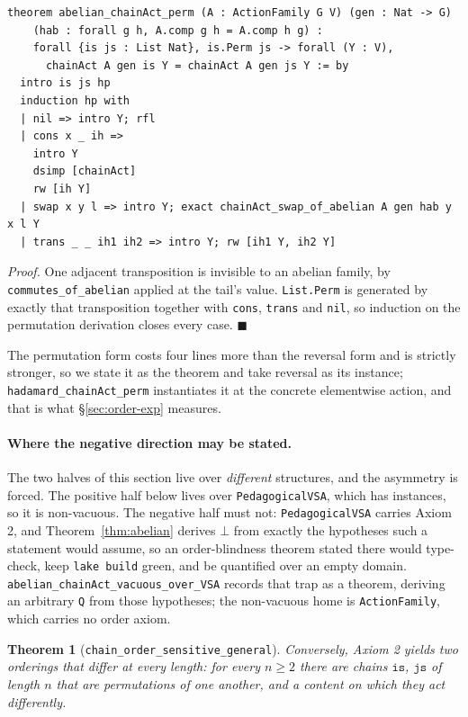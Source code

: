 \documentclass[10pt]{article}
\newtheorem{theorem}{Theorem}[section]
\begin{document}
\begin{lstlisting}
theorem abelian_chainAct_perm (A : ActionFamily G V) (gen : Nat -> G)
    (hab : forall g h, A.comp g h = A.comp h g) :
    forall {is js : List Nat}, is.Perm js -> forall (Y : V),
      chainAct A gen is Y = chainAct A gen js Y := by
  intro is js hp
  induction hp with
  | nil => intro Y; rfl
  | cons x _ ih =>
    intro Y
    dsimp [chainAct]
    rw [ih Y]
  | swap x y l => intro Y; exact chainAct_swap_of_abelian A gen hab y x l Y
  | trans _ _ ih1 ih2 => intro Y; rw [ih1 Y, ih2 Y]
\end{lstlisting}

\emph{Proof.} One adjacent transposition is invisible to an abelian family, by \texttt{commutes\_of\_abelian} applied at the tail's value. \texttt{List.Perm} is generated by exactly that transposition together with \texttt{cons}, \texttt{trans} and \texttt{nil}, so induction on the permutation derivation closes every case. $\blacksquare$

The permutation form costs four lines more than the reversal form and is strictly stronger, so we state it as the theorem and take reversal as its instance; \texttt{hadamard\_chainAct\_perm} instantiates it at the concrete elementwise action, and that is what \S\ref{sec:order-exp} measures.

\paragraph{Where the negative direction may be stated.} The two halves of this section live over \emph{different} structures, and the asymmetry is forced. The positive half below lives over \texttt{PedagogicalVSA}, which has instances, so it is non-vacuous. The negative half must not: \texttt{PedagogicalVSA} carries Axiom 2, and Theorem~\ref{thm:abelian} derives $\bot$ from exactly the hypotheses such a statement would assume, so an order-blindness theorem stated there would type-check, keep \texttt{lake build} green, and be quantified over an empty domain. \texttt{abelian\_chainAct\_vacuous\_over\_VSA} records that trap as a theorem, deriving an arbitrary \texttt{Q} from those hypotheses; the non-vacuous home is \texttt{ActionFamily}, which carries no order axiom.

\begin{theorem}[\texttt{chain\_order\_sensitive\_general}]
\label{thm:order-general}
Conversely, Axiom 2 yields two orderings that differ at \emph{every} length: for every $n \geq 2$ there are chains $\texttt{is}$, $\texttt{js}$ of length $n$ that are permutations of one another, and a content on which they act differently.
\end{theorem}
\end{document}
